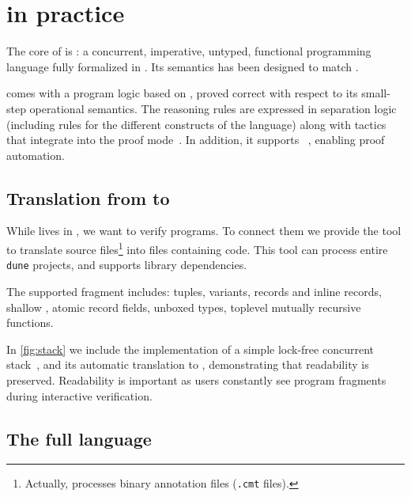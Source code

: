 \section{\Zoo in practice}
\label{sec:zoo}


The core of \Zoo is \ZooLang: a concurrent, imperative, untyped, functional programming language fully formalized in \Rocq.
Its semantics has been designed to match \OCaml.

\ZooLang comes with a program logic based on \Iris, proved correct with respect to its small-step operational semantics.
The reasoning rules are expressed in separation logic (including rules for the different constructs of the language) along with \Rocq tactics that integrate into the \Iris proof mode~\citep{DBLP:journals/pacmpl/KrebbersJ0TKTCD18}.
In addition, it supports \Diaframe~\citep{DBLP:conf/pldi/MulderKG22,DBLP:journals/pacmpl/MulderK23}, enabling proof automation.

\subsection{Translation from \OCaml to \ZooLang}



While \ZooLang lives in \Rocq, we want to verify \OCaml programs.
To connect them we provide the tool \ocamlToZoo to translate \OCaml source files\footnote{Actually, \ocamlToZoo processes binary annotation files (\texttt{.cmt} files).} into \Rocq files containing \ZooLang code.
This tool can process entire \texttt{dune} projects, and supports library dependencies.

The supported \OCaml fragment includes: tuples, variants, records and inline records, shallow , atomic record fields, unboxed types, toplevel mutually recursive functions.

In \cref{fig:stack} we include the \OCaml implementation of a simple lock-free concurrent stack~\citep{thomas1986systems}, and its automatic translation to \ZooLang, demonstrating that readability is preserved.
Readability is important as users constantly see program fragments during interactive verification.

\subsection{The full language}

